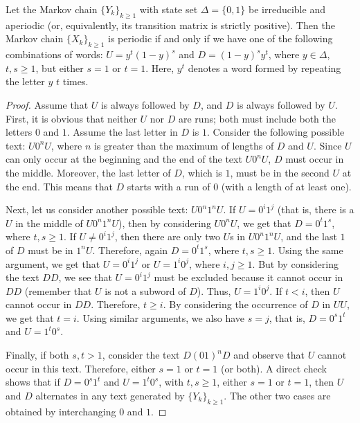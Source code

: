\documentclass[10pt,a4paper]{amsart}
\begin{document}
\begin{Proposition}
Let the Markov chain $\{Y_k\}_{k\geq 1}$ with state set $\Delta=\{0,1\}$ be irreducible and
aperiodic (or, equivalently, its transition matrix is strictly positive).
Then the Markov chain $\{X_k\}_{k\geq 1}$ is periodic if and only if
we have one of the following combinations of words: $U = y^t(1-y)^s$ and
$D = (1-y)^sy^t$, where $y \in \Delta$, $t, s \geq 1$, but either $s = 1$ or
$t = 1$. Here, $y^t$ denotes a word formed by repeating the letter $y$ $t$ times.
\end{Proposition}

\begin{proof}
Assume that $U$ is always followed by $D$, and $D$ is always followed by $U$.
First, it is obvious that neither $U$ nor $D$ are runs; both must include both
the letters $0$ and $1$. Assume the last letter in $D$ is $1$. Consider the following
possible text: $U0^nU$, where $n$ is greater than the maximum of  lengths of $D$ and $U$.
Since $U$ can only occur at the beginning and the end of the text $U0^nU$,
$D$ must occur in the middle. Moreover, the last letter of $D$, which is $1$,
must be in the second $U$ at the end.  This means that $D$ starts with a run of $0$
(with a length of at least one).

Next, let us consider another possible text: $U0^n1^nU$. If $U=0^i1^j$ (that is, there
is a $U$ in the middle of $U0^n1^nU$), then by considering $U0^nU$, we get that $D=0^t1^s$,
where $t, s \geq 1$. If $U\neq 0^i1^j$, then there are only two $U$s in $U0^n1^nU$, and the
last $1$ of $D$ must be in $1^nU$. Therefore, again $D=0^t1^s$, where $t, s \geq 1$.
Using the same argument, we get that $U=0^i1^j$ or $U=1^i0^j$, where $i, j \geq 1$.
But by considering the text $DD$, we see that $U=0^i1^j$ must be excluded because
it cannot occur in $DD$ (remember that $U$ is not a subword of $D$). Thus, $U=1^i0^j$. If $t<i$,
then $U$ cannot occur in $DD$. Therefore, $t \geq i$.
By considering the occurrence of $D$ in $UU$, we get that $t=i$.
Using similar arguments, we also have $s=j$, that is, $D=0^s1^t$ and $U=1^t0^s$.

Finally, if both $s,t>1$, consider the text $D(01)^nD$ and observe that $U$ cannot
occur in this text. Therefore, either $s=1$ or $t=1$ (or both). A direct check
shows that if $D=0^s1^t$ and $U=1^t0^s$, with $t,s\geq 1$, either $s = 1$ or
$t = 1$, then $U$ and $D$ alternates in any text generated by $\{Y_k\}_{k\geq 1}$.
The other two cases are obtained by interchanging $0$ and $1$.
\end{proof}
\end{document}
